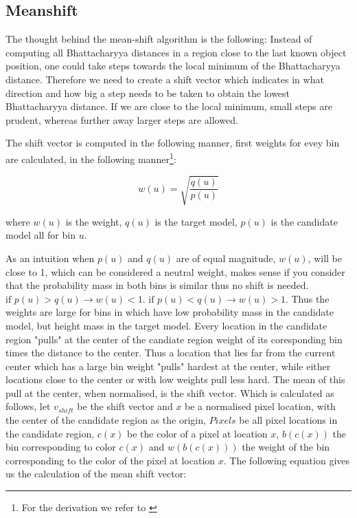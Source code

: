 \documentclass[a4paper,11pt]{article}
\begin{document}
\subsection{Meanshift}

The thought behind the mean-shift algorithm is the following: Instead of computing all Bhattacharyya distances in a region close to the last known object position, one could take steps towards the local minimum of the Bhattacharyya distance. Therefore we need to create a shift vector which indicates in what direction and how big a step needs to be taken to obtain the lowest Bhattacharyya distance. If we are close to the local minimum, small steps are prudent, whereas further away larger steps are allowed. 



The shift vector is computed in the following manner, first weights for evey bin are calculated, in the following manner\footnote{For the derivation we refer to \cite{mean_shift}\label{fn:derivation_refer}}:



\begin{equation}
\label{eq:weights}
w(u) = \sqrt{\frac{q(u)}{p(u)}}
\end{equation} %

where $w(u)$ is the weight, $q(u)$ is the target model, $p(u)$ is the candidate model all for bin $u$.



As an intuition when $p(u)$ and $q(u)$ are of equal magnitude, $w(u)$, will be close to 1, which can be considered a neutral weight, makes sense if you consider that the probability mass in both bins is similar thus no shift is needed. $\textrm{if }p(u) > q(u) \rightarrow w(u) < 1$.  $\textrm{if }p(u) < q(u) \rightarrow w(u) > 1$. Thus the weights are large for bins in  which have low probability mass in the candidate model, but height mass in the target model. Every location in the candidate region "pulls" at the center of the candiate region  weight of its coresponding bin times the distance to the center. Thus a location that lies far from the current center which has a large bin weight "pulls" hardest at the center, while either locations close to the center or with low weights pull less hard. The mean of this pull at the center, when normalised, is the shift vector. Which is calculated as follows, let $v_{shift}$ be the shift vector and $x$ be a normalised pixel location, with the center of the candidate region as the origin, $Pixels$ be all pixel locations in the candidate region, $c(x)$ be the color of a pixel at location $x$, $b(c(x))$ the bin corresponding to color $c(x)$ and $w(b(c(x)))$ the weight of the bin corresponding to the color of the pixel at location $x$. The following equation gives us the calculation of the mean shift vector:
\end{document}
